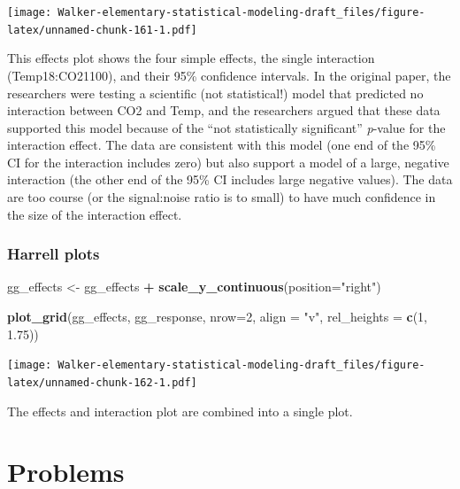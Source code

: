 \documentclass[]{book}
\newenvironment{Shaded}{\begin{snugshade}}{\end{snugshade}}
\newcommand{\DataTypeTok}[1]{\textcolor[rgb]{0.13,0.29,0.53}{#1}}
\newcommand{\DecValTok}[1]{\textcolor[rgb]{0.00,0.00,0.81}{#1}}
\newcommand{\FloatTok}[1]{\textcolor[rgb]{0.00,0.00,0.81}{#1}}
\newcommand{\KeywordTok}[1]{\textcolor[rgb]{0.13,0.29,0.53}{\textbf{#1}}}
\newcommand{\NormalTok}[1]{#1}
\newcommand{\OperatorTok}[1]{\textcolor[rgb]{0.81,0.36,0.00}{\textbf{#1}}}
\newcommand{\StringTok}[1]{\textcolor[rgb]{0.31,0.60,0.02}{#1}}
\begin{document}
\texttt{[image: Walker-elementary-statistical-modeling-draft\_files/figure-latex/unnamed-chunk-161-1.pdf]}

This effects plot shows the four simple effects, the single interaction (Temp18:CO21100), and their 95\% confidence intervals. In the original paper, the researchers were testing a scientific (not statistical!) model that predicted no interaction between CO2 and Temp, and the researchers argued that these data supported this model because of the ``not statistically significant'' \emph{p}-value for the interaction effect. The data are consistent with this model (one end of the 95\% CI for the interaction includes zero) but also support a model of a large, negative interaction (the other end of the 95\% CI includes large negative values). The data are too course (or the signal:noise ratio is to small) to have much confidence in the size of the interaction effect.

\hypertarget{harrell-plots}{%
\subsubsection{Harrell plots}\label{harrell-plots}}

\begin{Shaded}
\begin{Highlighting}[]
\NormalTok{gg_effects <-}\StringTok{ }\NormalTok{gg_effects }\OperatorTok{+}\StringTok{ }\KeywordTok{scale_y_continuous}\NormalTok{(}\DataTypeTok{position=}\StringTok{"right"}\NormalTok{)}

\KeywordTok{plot_grid}\NormalTok{(gg_effects, gg_response, }\DataTypeTok{nrow=}\DecValTok{2}\NormalTok{, }
          \DataTypeTok{align =} \StringTok{"v"}\NormalTok{, }
          \DataTypeTok{rel_heights =} \KeywordTok{c}\NormalTok{(}\DecValTok{1}\NormalTok{, }\FloatTok{1.75}\NormalTok{))}
\end{Highlighting}
\end{Shaded}

\texttt{[image: Walker-elementary-statistical-modeling-draft\_files/figure-latex/unnamed-chunk-162-1.pdf]}

The effects and interaction plot are combined into a single plot.

\hypertarget{problems}{%
\section{Problems}\label{problems}}
\end{document}
